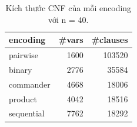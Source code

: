 \begin{table}[t]
\centering
\caption{Kích thước CNF của mỗi encoding với n = 40.}
\label{tab:structure}
\begin{tabular}{lrr}
\toprule
encoding & \#vars & \#clauses \\
\midrule
pairwise & 1600 & 103520 \\
binary & 2776 & 35584 \\
commander & 4668 & 18006 \\
product & 4042 & 18516 \\
sequential & 7762 & 18292 \\
\bottomrule
\end{tabular}
\end{table}
